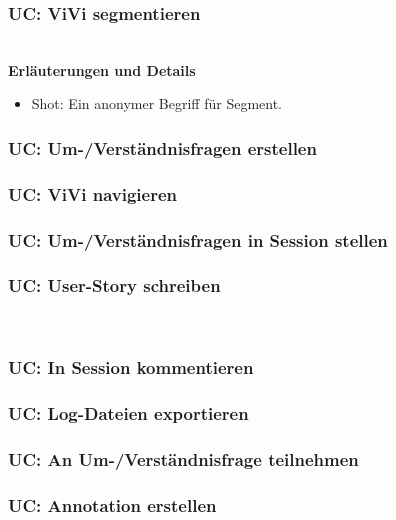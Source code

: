 \subsubsection{UC: ViVi segmentieren}

\\[0.5cm]
\textbf{Erläuterungen und Details}
\begin{itemize}
	\item Shot: Ein anonymer Begriff für Segment.
\end{itemize}
\pagebreak

\subsubsection{UC: Um-/Verständnisfragen erstellen}

\pagebreak

\subsubsection{UC: ViVi navigieren}

\pagebreak

\subsubsection{UC: Um-/Verständnisfragen in Session stellen}

\pagebreak

\subsubsection{UC: User-Story schreiben}

\\[0.5cm]
\pagebreak

\subsubsection{UC: In Session kommentieren}

\pagebreak

\subsubsection{UC: Log-Dateien exportieren}

\pagebreak

\subsubsection{UC: An Um-/Verständnisfrage teilnehmen}

\pagebreak

\subsubsection{UC: Annotation erstellen}

\pagebreak